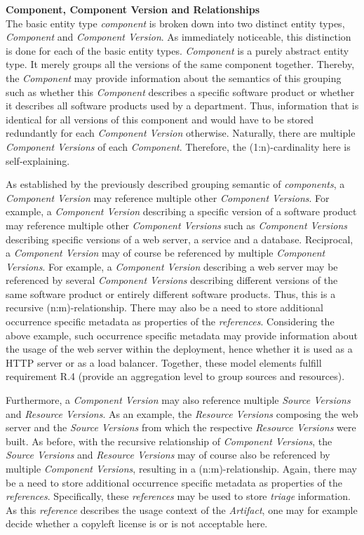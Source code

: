 \noindent\textbf{Component, Component Version and Relationships}\\
The basic entity type \emph{component} is broken down into two distinct entity types, \emph{Component} and \emph{Component Version}. As immediately noticeable, this distinction is done for each of the basic entity types. \emph{Component} is a purely abstract entity type. It merely groups all the versions of the same component together. Thereby, the \emph{Component} may provide information about the semantics of this grouping such as whether this \emph{Component} describes a specific software product or whether it describes all software products used by a department. Thus, information that is identical for all versions of this component and would have to be stored redundantly for each \emph{Component Version} otherwise. Naturally, there are multiple \emph{Component Versions} of each \emph{Component}. Therefore, the (1:n)-cardinality here is self-explaining.\par 
As established by the previously described grouping semantic of \emph{components}, a \emph{Component Version} may reference multiple other \emph{Component Versions}. For example, a \emph{Component Version} describing a specific version of a software product may reference multiple other \emph{Component Versions} such as \emph{Component Versions} describing specific versions of a web server, a service and a database. Reciprocal, a \emph{Component Version} may of course be referenced by multiple \emph{Component Versions}. For example, a \emph{Component Version} describing a web server may be referenced by several \emph{Component Versions} describing different versions of the same software product or entirely different software products. Thus, this is a recursive (n:m)-relationship. There may also be a need to store additional occurrence specific metadata as properties of the \emph{references}. Considering the above example, such occurrence specific metadata may provide information about the usage of the web server within the deployment, hence whether it is used as a HTTP server or as a load balancer. Together, these model elements fulfill requirement R.4 (provide an aggregation level to group sources and resources).\par
Furthermore, a \emph{Component Version} may also reference multiple \emph{Source Versions} and \emph{Resource Versions}. As an example, the \emph{Resource Versions} composing the web server and the \emph{Source Versions} from which the respective \emph{Resource Versions} were built. As before, with the recursive relationship of \emph{Component Versions}, the \emph{Source Versions} and \emph{Resource Versions} may of course also be referenced by multiple \emph{Component Versions}, resulting in a (n:m)-relationship. Again, there may be a need to store additional occurrence specific metadata as properties of the \emph{references}. Specifically, these \emph{references} may be used to store \emph{triage} information. As this \emph{reference} describes the usage context of the \emph{Artifact}, one may for example decide whether a copyleft license is or is not acceptable here.\\ 

